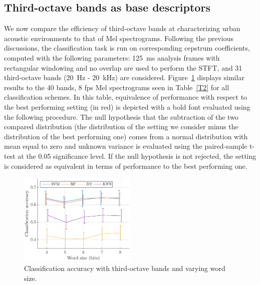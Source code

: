 \documentclass[sensors,article,submit,moreauthors,pdftex,10pt,a4paper]{mdpi}
\begin{document}
\subsection{Third-octave bands as base descriptors}

We now compare the efficiency of third-octave bands at characterizing urban acoustic environments to that of Mel spectrograms. Following the previous discussions, the classification task is run on corresponding cepstrum coefficients, computed with the following parameters: 125~ms analysis frames with rectangular windowing and no overlap are used to perform the STFT, and 31 third-octave bands (20~Hz - 20~kHz) are considered. Figure~\ref{fig:class_tob_q} displays similar results to the 40 bands, 8 fps Mel spectrograms seen in Table~\ref{T2} for all classification schemes. In this table, equivalence of performance with respect to the best performing setting (in red) is depicted with a bold font evaluated using the following procedure. The null hypothesis that the subtraction of the two compared distribution (the distribution of the setting we consider minus the distribution of the best performing one) comes from a normal distribution with mean equal to zero and unknown variance is evaluated using the paired-sample t-test at the 0.05 significance level. If the null hypothesis is not rejected, the setting is considered as equivalent in terms of performance to the best performing one. \\

\begin{figure}[htbp]
	\centering
		\includegraphics[width=0.5\textwidth]{figures/class_tob_q.eps}
	\caption{Classification accuracy with third-octave bands and varying word size.}
	\label{fig:class_tob_q}
\end{figure}
\end{document}
